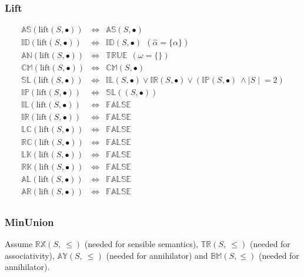\documentclass[10pt]{article}
\newcommand{\propname}[1]{{\mathbb{#1}}}
\begin{document}
\subsubsection{Lift} 
\[
\begin{array}{rcl} 
\propname{AS}(\mathrm{lift}(S, \bullet)) 
   & \Leftrightarrow 
   & \propname{AS}(S, \bullet) \\ 
\propname{ID}(\mathrm{lift}(S, \bullet)) 
   & \Leftrightarrow 
   & \propname{ID}(S, \bullet)  \ \ (\hat{\alpha} = \{\alpha\})\\ 
\propname{AN}(\mathrm{lift}(S, \bullet)) 
   & \Leftrightarrow 
   & \propname{TRUE} \ \ (\omega = \{\})\\ 
\propname{CM}(\mathrm{lift}(S, \bullet)) 
   & \Leftrightarrow 
   & \propname{CM}(S, \bullet) \\ 
\propname{SL}(\mathrm{lift}(S, \bullet)) 
   & \Leftrightarrow 
   & \propname{IL}(S, \bullet) 
     \vee \propname{IR}(S, \bullet) 
     \vee (\propname{IP}(S, \bullet)\ \wedge {\mid S \mid} = 2) \\ 
\propname{IP}(\mathrm{lift}(S, \bullet)) 
   & \Leftrightarrow 
   & \propname{SL}((S, \bullet)) \\ 
\propname{IL}(\mathrm{lift}(S, \bullet)) 
   & \Leftrightarrow 
   & \propname{FALSE} \\ 
\propname{IR}(\mathrm{lift}(S, \bullet)) 
   & \Leftrightarrow 
   & \propname{FALSE} \\ 
\propname{LC}(\mathrm{lift}(S, \bullet)) 
   & \Leftrightarrow 
   & \propname{FALSE} \\ 
\propname{RC}(\mathrm{lift}(S, \bullet)) 
   & \Leftrightarrow 
   & \propname{FALSE} \\ 
\propname{LK}(\mathrm{lift}(S, \bullet)) 
   & \Leftrightarrow 
   & \propname{FALSE} \\ 
\propname{RK}(\mathrm{lift}(S, \bullet)) 
   & \Leftrightarrow 
   & \propname{FALSE} \\  
\propname{AL}(\mathrm{lift}(S, \bullet))  
   & \Leftrightarrow 
   & \propname{FALSE} \\
\propname{AR}(\mathrm{lift}(S, \bullet))  
   & \Leftrightarrow 
   & \propname{FALSE} \\ 
\end{array} 
\]

\subsubsection{MinUnion} 

Assume $\propname{RX}(S,\ \leq)$ (needed for sensible semantics), $\propname{TR}(S,\ \leq)$ (needed for associativity), $\propname{AY}(S,\ \leq)$ (needed for annihilator) and $\propname{BM}(S,\leq)$ (needed for annihilator).
\end{document}
